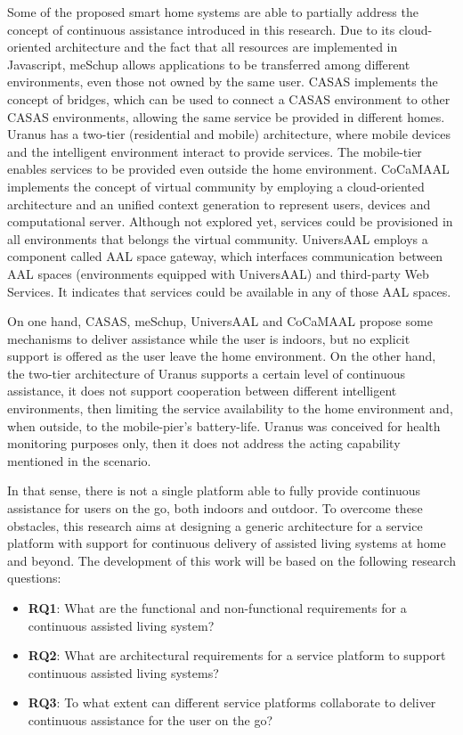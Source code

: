 \documentclass[]{scrartcl}
\begin{document}
Some of the proposed smart home systems are able to partially address the concept of continuous assistance introduced in this research.
Due to its cloud-oriented architecture and the fact that all resources are implemented in Javascript, meSchup \cite{kubitza2015towards} allows applications to be transferred among different environments, even those not owned by the same user.  
CASAS \cite{CASAS} implements the concept of bridges, which can be used to connect a CASAS environment to other CASAS environments, allowing the same service be provided in different homes.
Uranus \cite{Uranus} has a two-tier (residential and mobile) architecture, where mobile devices and the intelligent environment interact to provide services. The mobile-tier enables services to be provided even outside the home environment. 
CoCaMAAL \cite{cocamaal} implements the concept of virtual community by employing a cloud-oriented architecture and an unified context generation to represent users, devices and computational server. 
Although not explored yet, services could be provisioned in all environments that belongs the virtual community.
UniversAAL \cite{hanke2011universaal} employs a component called AAL space gateway, which interfaces communication between AAL spaces (environments equipped with UniversAAL) and third-party Web Services.
It indicates that services could be available in any of those AAL spaces.

On one hand, CASAS, meSchup, UniversAAL and CoCaMAAL propose some mechanisms to deliver assistance while the user is indoors, but no explicit support is offered as the user leave the home environment. 
On the other hand, the two-tier architecture of Uranus supports a certain level of continuous assistance, it does not support cooperation between different intelligent environments, then limiting the service availability to the home environment and, when outside, to the mobile-pier's battery-life.
Uranus was conceived for health monitoring purposes only, then it does not address the acting capability mentioned in the scenario. 

In that sense, there is not a single platform able to fully provide continuous assistance for users on the go, both indoors and outdoor. To overcome these obstacles, this research aims at designing a generic architecture for a service platform with support for continuous delivery of assisted living systems at home and beyond. The development of this work will be based on the following research questions:
\begin{itemize}
	\item \textbf{RQ1}: What are the functional and non-functional requirements for a continuous assisted living system?
	\item \textbf{RQ2}: What are architectural requirements for a service platform to support continuous assisted living systems?
	\item \textbf{RQ3}: To what extent can different service platforms collaborate to deliver continuous assistance for the user on the go?
\end{itemize}



\end{document}
